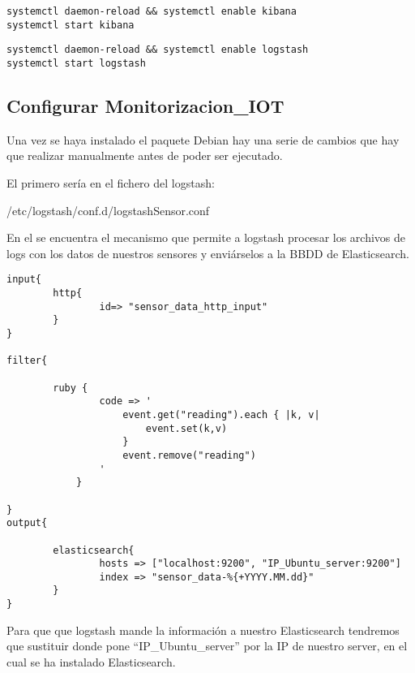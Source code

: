  
 
 \begin{lstlisting}[frame=single]  
systemctl daemon-reload && systemctl enable kibana
systemctl start kibana
\end{lstlisting}
 
 
 \begin{lstlisting}[frame=single] 
systemctl daemon-reload && systemctl enable logstash
systemctl start logstash

\end{lstlisting}
 
 \subsection{Configurar Monitorizacion\_IOT}
 
 Una vez se haya instalado el paquete Debian hay una serie de cambios que hay que realizar manualmente antes de poder ser ejecutado.
 
 El primero sería en el fichero del logstash:
 
 /etc/logstash/conf.d/logstashSensor.conf
 
 En el se encuentra el mecanismo que permite a logstash procesar los archivos de logs con los datos de nuestros sensores y enviárselos a la BBDD de Elasticsearch.
 
 \begin{verbatim}
input{
        http{
                id=> "sensor_data_http_input"
        }
}

filter{

        ruby {
                code => '
                    event.get("reading").each { |k, v|
                        event.set(k,v)
                    }
                    event.remove("reading")
                '
            }

}
output{

        elasticsearch{
                hosts => ["localhost:9200", "IP_Ubuntu_server:9200"]
                index => "sensor_data-%{+YYYY.MM.dd}"
        }
}
 \end{verbatim}
 
Para que que logstash mande la información a nuestro Elasticsearch tendremos que sustituir donde pone ``IP\_Ubuntu\_server'' por la IP de nuestro server, en el cual se ha instalado Elasticsearch.


